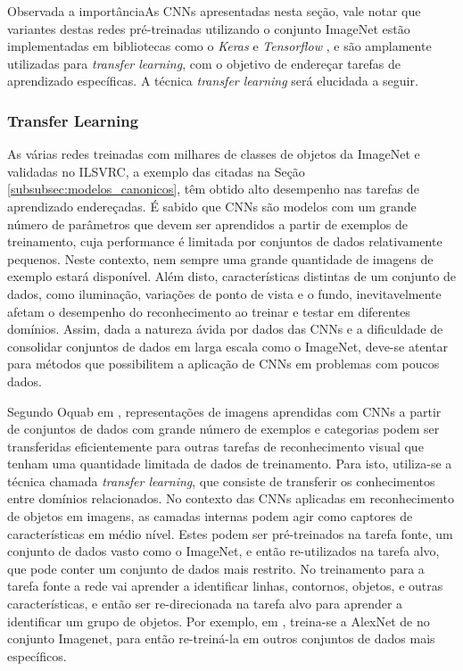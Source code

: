 Observada a importânciaAs CNNs apresentadas nesta seção, vale notar que variantes destas redes pré-treinadas utilizando o conjunto ImageNet estão implementadas em bibliotecas como o \emph{Keras} \cite{keras:applications} e \emph{Tensorflow} \cite{tensorflow:models}, e são amplamente utilizadas para \emph{transfer learning}, com o objetivo de endereçar tarefas de aprendizado específicas. A técnica \emph{transfer learning} será elucidada a seguir.

\subsubsection{Transfer Learning}
As várias redes treinadas com milhares de classes de objetos da ImageNet e validadas no ILSVRC, a exemplo das citadas na Seção \ref{subsubsec:modelos_canonicos}, têm obtido alto desempenho nas tarefas de aprendizado endereçadas. É sabido que CNNs são modelos com um grande número de parâmetros que devem ser aprendidos a partir de exemplos de treinamento, cuja performance é limitada por conjuntos de dados relativamente pequenos. Neste contexto, nem sempre uma grande quantidade de imagens de exemplo estará disponível. Além disto, características distintas de um conjunto de dados, como iluminação, variações de ponto de vista e o fundo, inevitavelmente afetam o desempenho do reconhecimento ao treinar e testar em diferentes domínios. Assim, dada a natureza ávida por dados das CNNs e a dificuldade de consolidar conjuntos de dados em larga escala como o ImageNet, deve-se atentar para métodos que possibilitem a aplicação de CNNs em problemas com poucos dados.

Segundo Oquab em \cite{oquab2014learning}, representações de imagens aprendidas com CNNs a partir de conjuntos de dados com grande número de exemplos e categorias podem ser transferidas eficientemente para outras tarefas de reconhecimento visual que tenham uma quantidade limitada de dados de treinamento. Para isto, utiliza-se a técnica chamada \emph{transfer learning}, que consiste de transferir os conhecimentos entre domínios relacionados. No contexto das CNNs aplicadas em reconhecimento de objetos em imagens, as camadas internas podem agir como captores de características em médio nível. Estes podem ser pré-treinados na tarefa fonte, um conjunto de dados vasto como o ImageNet, e então re-utilizados na tarefa alvo, que pode conter um conjunto de dados mais restrito. No treinamento para a tarefa fonte a rede vai aprender a identificar linhas, contornos, objetos, e outras características, e então ser re-direcionada na tarefa alvo para aprender a identificar um grupo de objetos. Por exemplo, em \cite{zeiler2014visualizing}, treina-se a AlexNet de \cite{alexnet} no conjunto Imagenet, para então re-treiná-la em outros conjuntos de dados mais específicos.

